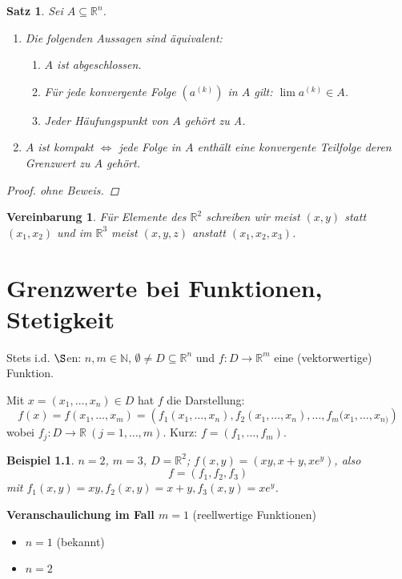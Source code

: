 \documentclass[12pt]{extreport} %
\newcommand{\N}{\mathbb{N}}
\newcommand{\R}{\mathbb{R}}
\theoremstyle{named}
\theoremstyle{nnamed}
\theoremstyle{itshape}
\newtheorem{satz}[unnamedtheorem]{Satz}
\theoremstyle{normal}
\newtheorem*{beispiel*}{Beispiel}
\newtheorem*{vereinbarung}{Vereinbarung}
\begin{document}
\begin{satz} \label{15.2:satz}
	Sei $A \subseteq \R^{n}$.
	\begin{enumerate}
		\item Die folgenden Aussagen sind äquivalent:
			\begin{enumerate}
				\item $A$ ist abgeschlossen.
				\item Für jede konvergente Folge $\left( a^{(k)} \right)$ in $A$ gilt: $\lim a^{(k)} \in A$.
				\item Jeder Häufungspunkt von $A$ gehört zu A.
			\end{enumerate}
		\item $A$ ist kompakt $\iff$ jede Folge in $A$ enthält eine konvergente Teilfolge deren Grenzwert zu $A$ gehört.
	\end{enumerate}

	\begin{proof}
		ohne Beweis.
	\end{proof}
\end{satz}


\begin{vereinbarung}
	Für Elemente des $\R^{2}$ schreiben wir meist $(x, y)$ statt $(x_{1}, x_{2})$ und im $\R^{3}$ meist $(x, y, z)$ anstatt $(x_{1}, x_{2}, x_{3})$.	
\end{vereinbarung}


\chapter{Grenzwerte bei Funktionen, Stetigkeit}


Stets i.d. $\S$en: $n, m \in \N$, $\emptyset \neq D \subseteq \R^{n}$ und $f \colon D \rightarrow \R^{m}$ eine (vektorwertige) Funktion. 

Mit $x = (x_{1}, \dotsc, x_{n}) \in D$ hat $f$  die Darstellung:
	$$ f(x) = f(x_{1}, \dotsc, x_{m}) = \left( f_{1}(x_{1}, \dotsc, x_{n}), f_{2}(x_{1}, \dotsc, x_{n}), \dotsc, f_{m}(x_{1}, \dotsc, x_{n)} \right) $$
wobei $f_{j} \colon D \rightarrow \R ~ (j = 1, \dotsc, m)$. Kurz: $f = (f_{1}, \dotsc, f_{m})$.


\begin{beispiel*}
	$n = 2$, $m = 3$, $D = \R^{2}$; $f(x, y) = (xy, x + y, xe^{y})$, also
	$$ f = (f_{1}, f_{2}, f_{3}) $$
	mit $f_{1}(x, y) = xy, f_{2}(x, y) = x + y,  f_{3}(x, y) = x e^{y}$.
\end{beispiel*}


\textbf{Veranschaulichung im Fall $m = 1$} (reellwertige Funktionen)
\begin{itemize}
	\item $n = 1$ (bekannt)
	\item $n = 2$ %
\end{itemize}
\end{document}
